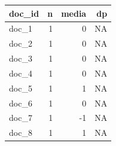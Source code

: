 \begin{table}[htbp]
  \centering

\begin{tabular}{lrrr}
\toprule
doc\_id & n & media & dp\\
\midrule
doc\_1 & 1 & 0 & NA\\
doc\_2 & 1 & 0 & NA\\
doc\_3 & 1 & 0 & NA\\
doc\_4 & 1 & 0 & NA\\
doc\_5 & 1 & 1 & NA\\
doc\_6 & 1 & 0 & NA\\
doc\_7 & 1 & -1 & NA\\
doc\_8 & 1 & 1 & NA\\
\bottomrule
\end{tabular}
\end{table}

